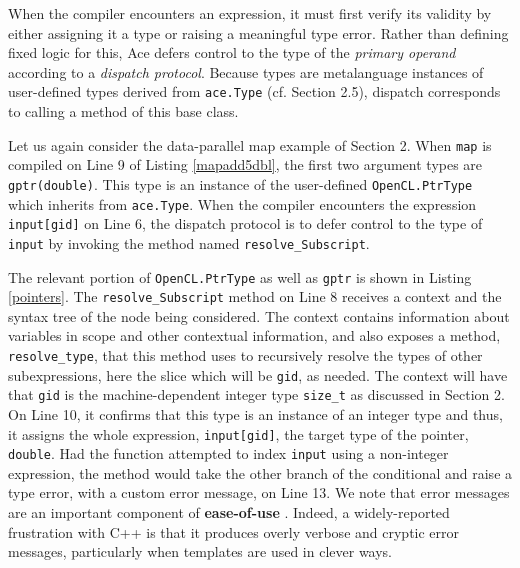 \documentclass[9pt,preprint]{sigplanconf}
\begin{document}
When the compiler encounters an expression, it must first verify its validity by either assigning it a type or raising a meaningful type error. Rather than defining fixed logic for this, Ace defers control to the {type} of the \emph{primary operand} according to a {\em dispatch protocol}. Because types are metalanguage instances of user-defined types derived from \verb|ace.Type| (cf. Section 2.5), dispatch corresponds to calling a method of this base class.

Let us again consider the data-parallel map example of Section 2. When \verb|map| is compiled on Line 9 of Listing \ref{mapadd5dbl}, the first two argument types are \verb|gptr(double)|. This type is an instance of the user-defined \verb|OpenCL.PtrType| which inherits from \verb|ace.Type|. When the compiler encounters the expression \verb|input[gid]| on Line 6, the dispatch protocol is to defer control to the type of \verb|input| by invoking the method named \verb|resolve_Subscript|.

The relevant portion of \verb|OpenCL.PtrType| as well as \verb|gptr| is shown in Listing \ref{pointers}. The \verb|resolve_Subscript| method on Line 8 receives a context and the syntax tree of the node being considered. The context contains information about variables in scope and other contextual information, and also exposes a method, \verb|resolve_type|, that this method uses to recursively resolve the types of other subexpressions, here the slice which will be \verb|gid|, as needed. The context will have that \verb|gid| is the machine-dependent integer type \verb|size_t| as discussed in Section 2. On Line 10, it confirms that this type is an instance of an integer type and thus, it assigns the whole expression, \verb|input[gid]|, the target type of the pointer, \verb|double|. Had the function attempted to index \verb|input| using a non-integer expression, the method would take the other branch of the conditional and raise a type error, with a custom error message, on Line 13. We note that error messages are an important component of \textbf{ease-of-use} \cite{marceau2011measuring}. Indeed, a widely-reported frustration with C++ is that it produces overly verbose and cryptic error messages, particularly when templates are used in clever ways.
\end{document}
